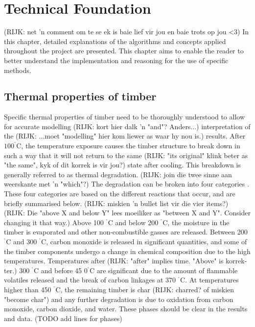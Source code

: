 \chapter{Technical Foundation} \label{tech}
(RIJK: net 'n comment om te se ek is baie lief vir jou en baie trots op jou <3)
In this chapter, detailed explanations of the algorithms and concepts applied throughout the project are presented. 
This chapter aims to enable the reader to better understand the implementation and reasoning for the use of specific methods.
\section{Thermal properties of timber}
Specific thermal properties of timber need to be thoroughly understood to allow for accurate modelling (RIJK: kort hier dalk 'n "and"?  Anders...) interpretation of the (RIJK: ...moet "modelling" hier kom liewer as waar hy nou is.) results.
After $100 ^{^\circ}$C, the temperature exposure causes the timber structure to break down in such a way that it will not return to the same (RIJK: "its original" klink beter as "the same", kyk of dit korrek is vir jou?) state after cooling.
This breakdown is generally referred to as thermal degradation. (RIJK: join die twee sinne aan weerskante met 'n "which"?)
The degradation can be broken into four categories \citep{White:2001} \citep{Shi:2021}.
These four categories are based on the different reactions that occur, and are briefly summarised below.
(RIJK:  miskien 'n bullet list vir die vier items?)
(RIJK:  Die "above X and below Y" lees moeiliker as "between X and Y".  Consider changing it that way.)
Above 100 $^{^\circ}$C and below 200 $^{^\circ}$C, the moisture in the timber is evaporated and other non-combustible gasses are released.
Between 200 $^{^\circ}$C and 300 $^{^\circ}$C, carbon monoxide is released in significant quantities, and some of the timber components undergo a change in chemical composition due to the high temperatures.
Temperatures after (RIJK: "after" implies time.  "Above" is korrek-ter.) 300 $^{^\circ}$C and before 45 0$^{^\circ}$C are significant due to the amount of flammable volatiles released and the break of carbon linkages at 370 $^{^\circ}$C.
At temperatures higher than 450 $^{^\circ}$C, the remaining timber is char (RIJK: charred? of miskien "become char") and any further degradation is due to oxidation from carbon monoxide, carbon dioxide, and water.
These phases should be clear in the results and data. (TODO add lines for phases)

